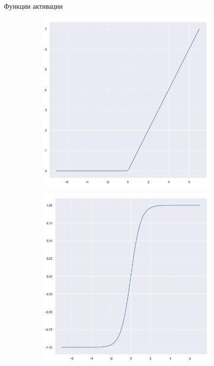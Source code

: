 \documentclass[aspectratio=169]{beamer}
\begin{document}
\begin{frame}{Функции активации}
\begin{figure}
\begin{subfigure}[b]{.32\linewidth}
            \centering
            \includegraphics[width=\linewidth]{figures/fig12.png}
        \end{subfigure}
        \begin{subfigure}[b]{.32\linewidth}
            \centering
            \includegraphics[width=\linewidth]{figures/fig13.png}
        \end{subfigure}
    \end{figure}
\end{frame}
\end{document}
